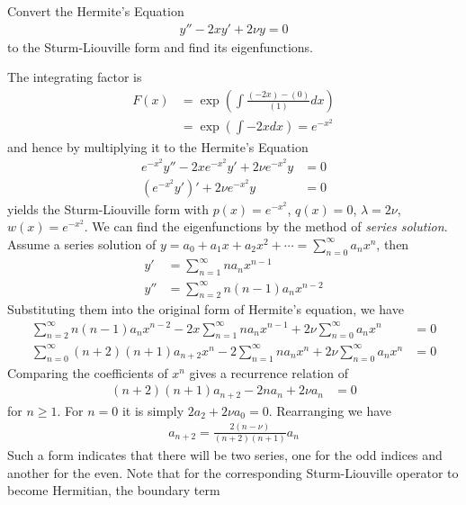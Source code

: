 \begin{exmp}
\label{exmp:hermiteeqn}
Convert the Hermite's Equation
\begin{align*}
y'' - 2xy' + 2\nu y = 0
\end{align*}
to the Sturm-Liouville form and find its eigenfunctions.
\end{exmp}
\begin{solution}
The integrating factor is
\begin{align*}
F(x) &= \exp(\int \frac{(-2x) - (0)}{(1)} dx) \\
&= \exp(\int -2x dx) = e^{-x^2}
\end{align*}
and hence by multiplying it to the Hermite's Equation
\begin{align*}
e^{-x^2}y'' - 2xe^{-x^2}y' + 2\nu e^{-x^2} y &= 0 \\
(e^{-x^2}y')' + 2\nu e^{-x^2} y &= 0
\end{align*}
yields the Sturm-Liouville form with $p(x) = e^{-x^2}$, $q(x) = 0$, $\lambda = 2\nu$, $w(x) = e^{-x^2}$. We can find the eigenfunctions by the method of \textit{series solution}. Assume a series solution of $y = a_0 + a_1x + a_2x^2 + \cdots = \sum_{n=0}^{\infty} a_n x^n$, then
\begin{align*}
y' &= \sum_{n=1}^{\infty} n a_nx^{n-1} \\
y'' &= \sum_{n=2}^{\infty} n(n-1) a_nx^{n-2}
\end{align*}
Substituting them into the original form of Hermite's equation, we have
\begin{align*}
\sum_{n=2}^{\infty} n(n-1) a_nx^{n-2} - 2x\sum_{n=1}^{\infty} n a_nx^{n-1} + 2\nu \sum_{n=0}^{\infty} a_n x^n &= 0 \\
\sum_{n=0}^{\infty} (n+2)(n+1) a_{n+2}x^{n} - 2\sum_{n=1}^{\infty} n a_nx^{n} + 2\nu \sum_{n=0}^{\infty} a_n x^n &= 0 
\end{align*}
Comparing the coefficients of $x^n$ gives a recurrence relation of
\begin{align*}
(n+2)(n+1)a_{n+2} - 2n a_n + 2\nu a_n &= 0
\end{align*}
for $n \geq 1$. For $n=0$ it is simply $2a_2 + 2\nu a_0 = 0$. Rearranging we have
\begin{align*}
a_{n+2} = \frac{2(n-\nu)}{(n+2)(n+1)}a_n
\end{align*}
Such a form indicates that there will be two series, one for the odd indices and another for the even. Note that for the corresponding Sturm-Liouville operator to become Hermitian, the boundary term 
\begin{align*}

\end{align*}
\end{solution}
